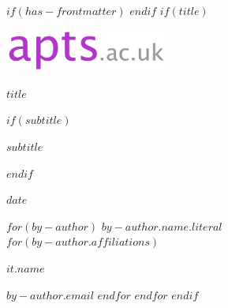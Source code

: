 $if(has-frontmatter)$
\frontmatter
$endif$
$if(title)$
\cleardoublepage
\thispagestyle{empty}
{\centering
\href{https://apts.ac.uk}{\includegraphics[width = 0.4\textwidth]{resources/apts-large.png}} \par
{\Huge\bfseries $title$ \par}
$if(subtitle)$
\vspace{1ex}
{\LARGE\bfseries $subtitle$ \par}
$endif$
\vspace{5ex}
{\bf\large $date$ \par}
\vspace{5ex}
$for(by-author)$
{\large \href{$by-author.url$}{$by-author.name.literal$}} \\
$for(by-author.affiliations)$%
{$it.name$ \par}
{$by-author.email$}
\vspace{2ex}
$endfor$
$endfor$%
$endif$
}

